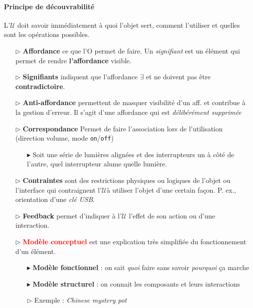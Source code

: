 \documentclass{report}
\begin{document}
\begin{multicols*}{3}
    \paragraph{Principe de découvrabilité}
    L'$\mathcal{U}$ doit savoir immédiatement à quoi l'objet sert, comment 
    l'utiliser et quelles sont les opérations possibles. 

    \begin{itemize}
      \item [$\rhd $]  \textbf{Affordance} ce que l'O permet de faire.  
            Un \textit{signifiant} est un élément qui permet de rendre 
            \textbf{l'affordance} visible.   

      \item [$\rhd $]  \textbf{Signifiants} indiquent que l'affordance 
        $\exists$ et ne doivent pas être \textbf{contradictoire}.   

      \item [$\rhd $]  \textbf{Anti-affordance} permettent de masquer 
        visibilité d'un aff. et contribue à la gestion d'erreur. 
        Il s'agit d'une affordance qui est \textit{délibérément supprimée}

      \item [$\rhd $]   \textbf{Correspondance} Permet de faire 
        l'association lors de l'utilisation 
        (direction volume, mode \texttt{on}/\texttt{off})
        \begin{itemize}
          \item [$\blacktriangleright$] Soit une série de lumières alignées et des interrupteurs un à côté 
            de l'autre, quel interrupteur alume quelle lumière. 
        \end{itemize}
        
        \item [$\rhd$ ] \textbf{Contraintes}  
          sont des restrictions physiques ou logiques de l'objet ou l'interface 
          qui contraignent l'$\mathcal{U}$à utiliser l'objet d'une certain façon. 
          P. ex., orientation d'une \textit{clé USB}.   

        \item [$\rhd$ ] \textbf{Feedback} permet d'indiquer à l'$\mathcal{U}$     
          l'effet de son action ou d'une interaction. 

        \item [$\rhd$ ] \textbf{\textcolor{red}{Modèle conceptuel}}
          est une explication très simplifiée 
          du fonctionnement d'un élément. 
          \begin{itemize}
            \item [$\blacktriangleright$ ] \textbf{Modèle fonctionnel} : on sait \textit{quoi} 
              faire sans savoir \textit{pourquoi} ça marche       
            \item [$\blacktriangleright$ ] \textbf{Modèle structurel} : on connait 
              les composants et leurs interactions
            \item[ $\rhd$] Exemple : \textit{Chinese mystery pot}  
          \end{itemize}
        

\end{itemize}
\end{multicols*}
\end{document}
